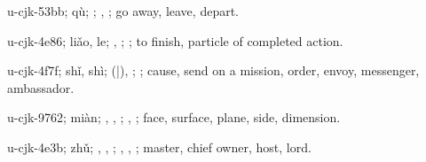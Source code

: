 \begin{multicols}{2}
{\cjkgGlue{}u-cjk-53bb; qù; \cjkgGlue{}\cjkgGlue{}\cjkgGlue{}; \cjkgGlue{}, \cjkgGlue{}; go away, leave, depart.

\cjkgGlue{}u-cjk-4e86; liǎo, le; \cjkgGlue{}, \cjkgGlue{}; \cjkgGlue{}; to finish, particle of completed action.

\cjkgGlue{}u-cjk-4f7f; shǐ, shì; \cjkgGlue{}\cjkgGlue{}(\cjkgGlue{}|\cjkgGlue{}), \cjkgGlue{}\cjkgGlue{}\cjkgGlue{}; \cjkgGlue{}; cause, send on a mission, order, envoy, messenger, ambassador.

\cjkgGlue{}u-cjk-9762; miàn; \cjkgGlue{}, \cjkgGlue{}, \cjkgGlue{}; \cjkgGlue{}, \cjkgGlue{}; face, surface, plane, side, dimension.

\cjkgGlue{}u-cjk-4e3b; zhǔ; \cjkgGlue{}, \cjkgGlue{}, \cjkgGlue{}; \cjkgGlue{}, \cjkgGlue{}, \cjkgGlue{}; master, chief owner, host, lord.

}
\end{multicols}
